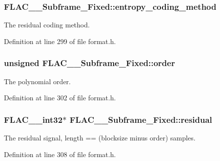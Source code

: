 \subsubsection[{\texorpdfstring{entropy\+\_\+coding\+\_\+method}{entropy_coding_method}}]{ F\+L\+A\+C\+\_\+\+\_\+\+Subframe\+\_\+\+Fixed\+::entropy\+\_\+coding\+\_\+method}\hypertarget{struct_f_l_a_c_____subframe___fixed_a0f17f8f756cd2c8acc0262ef14c37088}{}\label{struct_f_l_a_c_____subframe___fixed_a0f17f8f756cd2c8acc0262ef14c37088}
The residual coding method. 

Definition at line 299 of file format.\+h.

\subsubsection[{\texorpdfstring{order}{order}}]{\setlength{\rightskip}{0pt plus 5cm}unsigned F\+L\+A\+C\+\_\+\+\_\+\+Subframe\+\_\+\+Fixed\+::order}\hypertarget{struct_f_l_a_c_____subframe___fixed_a73f6f3cce3f811c81532729dbad2df0d}{}\label{struct_f_l_a_c_____subframe___fixed_a73f6f3cce3f811c81532729dbad2df0d}
The polynomial order. 

Definition at line 302 of file format.\+h.

\subsubsection[{\texorpdfstring{residual}{residual}}]{ {\bf F\+L\+A\+C\+\_\+\+\_\+int32}$\ast$ F\+L\+A\+C\+\_\+\+\_\+\+Subframe\+\_\+\+Fixed\+::residual}\hypertarget{struct_f_l_a_c_____subframe___fixed_ab91be48874aec97177106a4086163188}{}\label{struct_f_l_a_c_____subframe___fixed_ab91be48874aec97177106a4086163188}
The residual signal, length == (blocksize minus order) samples. 

Definition at line 308 of file format.\+h.

